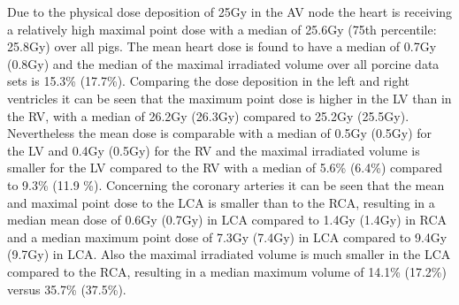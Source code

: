 \documentclass[type=dr, dr=rernat, accentcolor=tud7b,colorbacktitle, bigchapter, openright, twoside, 12pt ]{tudthesis}
\begin{document}
Due to the physical dose deposition of 25Gy in the AV node the heart is receiving a relatively high maximal point dose with a median of 
25.6Gy (75th percentile: 25.8Gy) over all pigs. The mean heart dose is found to have a median of 0.7Gy (0.8Gy) and the median of the 
maximal irradiated volume over all porcine data sets is 15.3\% (17.7\%). Comparing the dose deposition in the left and right ventricles 
it can be seen that the maximum point dose is higher in the LV than in the RV, with a median of 26.2Gy (26.3Gy) compared to 25.2Gy (25.5Gy). 
Nevertheless the mean dose is comparable with a median of 0.5Gy (0.5Gy) for the LV and 0.4Gy (0.5Gy) for the RV and the maximal irradiated 
volume is smaller for the LV compared to the RV with a median of 5.6\% (6.4\%) compared to 9.3\% (11.9 \%). Concerning the coronary arteries 
it can be seen that the mean and maximal point dose to the LCA is smaller than to the RCA, resulting in a median mean dose of 0.6Gy (0.7Gy) 
in LCA compared to 1.4Gy (1.4Gy) in RCA and a median maximum point dose of 7.3Gy (7.4Gy) in LCA compared to 9.4Gy (9.7Gy) in LCA. 
Also the maximal irradiated volume is much smaller in the LCA compared to the RCA, resulting in a median maximum volume of 14.1\% (17.2\%) 
versus 35.7\% (37.5\%). 


% 
\end{document}

